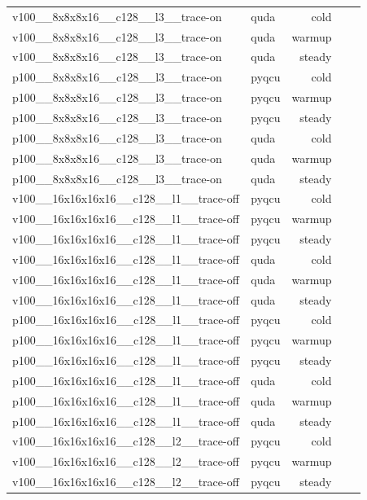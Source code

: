\begin{table}[htbp]
\begin{tabular}{@{}llrrr@{}}
v100\_\_8x8x8x16\_\_c128\_\_l3\_\_trace-on & quda & cold &  &  \\
v100\_\_8x8x8x16\_\_c128\_\_l3\_\_trace-on & quda & warmup &  &  \\
v100\_\_8x8x8x16\_\_c128\_\_l3\_\_trace-on & quda & steady &  &  \\
p100\_\_8x8x8x16\_\_c128\_\_l3\_\_trace-on & pyqcu & cold &  &  \\
p100\_\_8x8x8x16\_\_c128\_\_l3\_\_trace-on & pyqcu & warmup &  &  \\
p100\_\_8x8x8x16\_\_c128\_\_l3\_\_trace-on & pyqcu & steady &  &  \\
p100\_\_8x8x8x16\_\_c128\_\_l3\_\_trace-on & quda & cold &  &  \\
p100\_\_8x8x8x16\_\_c128\_\_l3\_\_trace-on & quda & warmup &  &  \\
p100\_\_8x8x8x16\_\_c128\_\_l3\_\_trace-on & quda & steady &  &  \\
v100\_\_16x16x16x16\_\_c128\_\_l1\_\_trace-off & pyqcu & cold &  &  \\
v100\_\_16x16x16x16\_\_c128\_\_l1\_\_trace-off & pyqcu & warmup &  &  \\
v100\_\_16x16x16x16\_\_c128\_\_l1\_\_trace-off & pyqcu & steady &  &  \\
v100\_\_16x16x16x16\_\_c128\_\_l1\_\_trace-off & quda & cold &  &  \\
v100\_\_16x16x16x16\_\_c128\_\_l1\_\_trace-off & quda & warmup &  &  \\
v100\_\_16x16x16x16\_\_c128\_\_l1\_\_trace-off & quda & steady &  &  \\
p100\_\_16x16x16x16\_\_c128\_\_l1\_\_trace-off & pyqcu & cold &  &  \\
p100\_\_16x16x16x16\_\_c128\_\_l1\_\_trace-off & pyqcu & warmup &  &  \\
p100\_\_16x16x16x16\_\_c128\_\_l1\_\_trace-off & pyqcu & steady &  &  \\
p100\_\_16x16x16x16\_\_c128\_\_l1\_\_trace-off & quda & cold &  &  \\
p100\_\_16x16x16x16\_\_c128\_\_l1\_\_trace-off & quda & warmup &  &  \\
p100\_\_16x16x16x16\_\_c128\_\_l1\_\_trace-off & quda & steady &  &  \\
v100\_\_16x16x16x16\_\_c128\_\_l2\_\_trace-off & pyqcu & cold &  &  \\
v100\_\_16x16x16x16\_\_c128\_\_l2\_\_trace-off & pyqcu & warmup &  &  \\
v100\_\_16x16x16x16\_\_c128\_\_l2\_\_trace-off & pyqcu & steady &  &  \\

\end{tabular}
\end{table}
